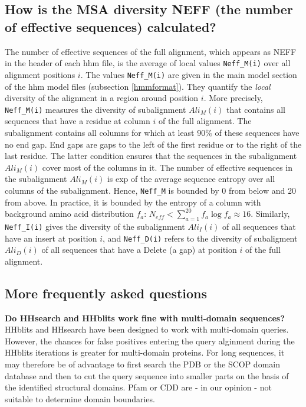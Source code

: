 \documentclass[11pt,a4paper]{article}
\begin{document}
\subsection{How is the MSA diversity NEFF (the number of effective sequences) calculated?}
The number of effective sequences of the full alignment, which appears as NEFF in the header of each hhm file, is the average of local values \verb`Neff_M(i)` over all alignment positions $i$. The values \verb`Neff_M(i)` are given in the main model section of the hhm model files (subsection \ref{hmmformat}). They quantify the \emph{local} diversity of the alignment in a region around position $i$. More precisely, \verb`Neff_M(i)` measures the diversity of subalignment $Ali_M(i)$ that contains all sequences that have a residue at column $i$ of the full alignment. The subalignment contains all columns for which at least 90\% of these sequences have no end gap. End gaps are gaps to the left of the first residue or to the right of the last residue. The latter condition ensures that the sequences in the subalignment $Ali_M(i)$ cover most of the columns in it. The number of effective sequences in the subalignment $Ali_M(i)$ is exp of the average sequence entropy over all columns of the subalignment. Hence, \verb`Neff_M` is bounded by 0 from below and 20 from above. In practice, it is bounded by the entropy of a column with background amino acid distribution $f_a$: $N_{eff} < \sum_{a=1}^{20} f_a \log f_a \approx 16$. Similarly, \verb`Neff_I(i)` gives the diversity of the subalignment $Ali_I(i)$ of all sequences that have an insert at position $i$, and \verb`Neff_D(i)` refers to the diversity of subaligment $Ali_D(i)$ of all sequences that have a Delete (a gap) at position $i$ of the full alignment. 



\subsection{More frequently asked questions}

{\bf Do HHsearch and HHblits work fine with multi-domain sequences?}
HHblits and HHsearch have been designed to work with multi-domain queries. However, the chances for false positives entering the query alginment during the HHblits iterations is greater for multi-domain proteins. For long sequences, it may therefore be of advantage to first search the PDB or the SCOP domain database and then to cut the query sequence into smaller parts on the basis of the identified structural domains. Pfam or CDD are - in our opinion - not suitable to determine domain boundaries.
\end{document}
